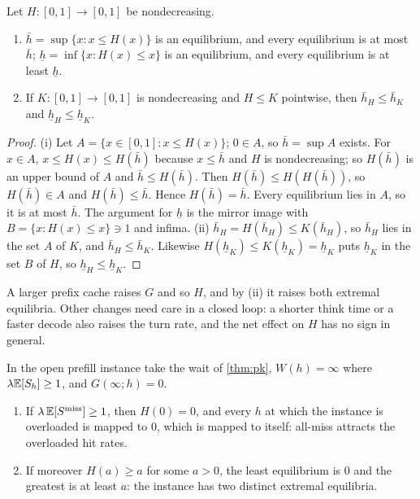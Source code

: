 \begin{proposition}\label{L5:prop:tarski}
Let $H:[0,1]\to[0,1]$ be nondecreasing.
\begin{enumerate}[label=(\roman*)]
\item $\bar h=\sup\{x:x\le H(x)\}$ is an equilibrium, and every equilibrium is at most
  $\bar h$; $\underline h=\inf\{x:H(x)\le x\}$ is an equilibrium, and every
  equilibrium is at least $\underline h$.
\item If $K:[0,1]\to[0,1]$ is nondecreasing and $H\le K$ pointwise, then
  $\bar h_H\le\bar h_K$ and $\underline h_H\le\underline h_K$.
\end{enumerate}
\end{proposition}

\begin{proof}
(i) Let $A=\{x\in[0,1]:x\le H(x)\}$; $0\in A$, so $\bar h=\sup A$ exists. For $x\in A$,
$x\le H(x)\le H(\bar h)$ because $x\le\bar h$ and $H$ is nondecreasing; so $H(\bar h)$ is
an upper bound of $A$ and $\bar h\le H(\bar h)$. Then $H(\bar h)\le H(H(\bar h))$, so
$H(\bar h)\in A$ and $H(\bar h)\le\bar h$. Hence $H(\bar h)=\bar h$. Every equilibrium lies
in $A$, so it is at most $\bar h$. The argument for $\underline h$ is the mirror image
with $B=\{x:H(x)\le x\}\ni1$ and infima.
(ii) $\bar h_H=H(\bar h_H)\le K(\bar h_H)$, so $\bar h_H$ lies in the set $A$ of $K$, and
$\bar h_H\le\bar h_K$. Likewise $H(\underline h_K)\le K(\underline h_K)=\underline h_K$
puts $\underline h_K$ in the set $B$ of $H$, so $\underline h_H\le\underline h_K$.
\end{proof}

A larger prefix cache raises $G$ and so $H$, and by (ii) it raises both extremal
equilibria. Other changes need care in a closed loop: a shorter think time or a faster
decode also raises the turn rate, and the net effect on $H$ has no sign in general.

\begin{proposition}[Collapse]\label{L5:prop:collapse}
In the open prefill instance take the wait of \cref{thm:pk}, $W(h)=\infty$ where
$\lambda\mathbb{E}[S_h]\ge1$, and $G(\infty;h)=0$.
\begin{enumerate}[label=(\roman*)]
\item If $\lambda\,\mathbb{E}[S^{\mathrm{miss}}]\ge1$, then $H(0)=0$, and every $h$ at which the
  instance is overloaded is mapped to 0, which is mapped to itself: all-miss attracts
  the overloaded hit rates.
\item If moreover $H(a)\ge a$ for some $a>0$, the least equilibrium is 0 and the
  greatest is at least $a$: the instance has two distinct extremal equilibria.
\end{enumerate}
\end{proposition}

